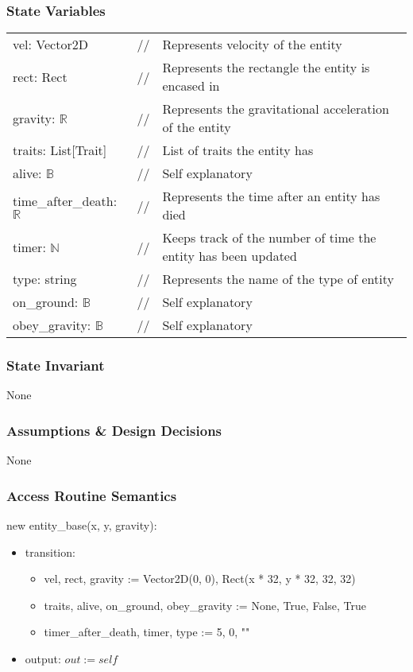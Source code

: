 \documentclass[12pt]{article}
\begin{document}
\subsubsection* {State Variables}
\begin{tabular}{lll}
vel: Vector2D & // & Represents velocity of the entity\\
rect: Rect & // & Represents the rectangle the entity is encased in\\
gravity: $\mathbb{R}$ & // & Represents the gravitational acceleration of the entity\\
traits: List[Trait] & // & List of traits the entity has\\
alive: $\mathbb{B}$ & // & Self explanatory\\
time\_after\_death: $\mathbb{R}$ & // & Represents the time after an entity has died\\
timer: $\mathbb{N}$ & // & Keeps track of the number of time the entity has been updated\\
type: string & // & Represents the name of the type of entity\\
on\_ground: $\mathbb{B}$ & // & Self explanatory\\
obey\_gravity: $\mathbb{B}$ & // & Self explanatory\\
\end{tabular}

\subsubsection* {State Invariant}

None

\subsubsection* {Assumptions \& Design Decisions}

None

\subsubsection* {Access Routine Semantics}

new entity\_base(x, y, gravity):
\begin{itemize}
    \item transition: 
    \begin{itemize}[]
        \item vel, rect, gravity := Vector2D(0, 0), Rect(x * 32, y * 32, 32, 32)
        \item traits, alive, on\_ground, obey\_gravity := None, True, False, True
        \item timer\_after\_death, timer, type := 5, 0, ""
    \end{itemize}
    \item output: $out := self$
\end{itemize}
\end{document}
